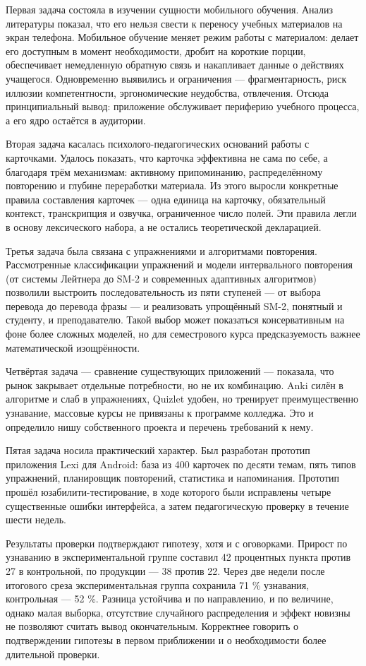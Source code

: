 \documentclass[11pt,a4paper,openany]{report}
\begin{document}
Первая задача состояла в изучении сущности мобильного обучения. Анализ литературы показал, что его нельзя свести к переносу учебных материалов на экран телефона. Мобильное обучение меняет режим работы с материалом: делает его доступным в момент необходимости, дробит на короткие порции, обеспечивает немедленную обратную связь и накапливает данные о действиях учащегося. Одновременно выявились и ограничения — фрагментарность, риск иллюзии компетентности, эргономические неудобства, отвлечения. Отсюда принципиальный вывод: приложение обслуживает периферию учебного процесса, а его ядро остаётся в аудитории.

Вторая задача касалась психолого-педагогических оснований работы с карточками. Удалось показать, что карточка эффективна не сама по себе, а благодаря трём механизмам: активному припоминанию, распределённому повторению и глубине переработки материала. Из этого выросли конкретные правила составления карточек — одна единица на карточку, обязательный контекст, транскрипция и озвучка, ограниченное число полей. Эти правила легли в основу лексического набора, а не остались теоретической декларацией.

Третья задача была связана с упражнениями и алгоритмами повторения. Рассмотренные классификации упражнений и модели интервального повторения (от системы Лейтнера до SM-2 и современных адаптивных алгоритмов) позволили выстроить последовательность из пяти ступеней — от выбора перевода до перевода фразы — и реализовать упрощённый SM-2, понятный и студенту, и преподавателю. Такой выбор может показаться консервативным на фоне более сложных моделей, но для семестрового курса предсказуемость важнее математической изощрённости.

Четвёртая задача — сравнение существующих приложений — показала, что рынок закрывает отдельные потребности, но не их комбинацию. Anki силён в алгоритме и слаб в упражнениях, Quizlet удобен, но тренирует преимущественно узнавание, массовые курсы не привязаны к программе колледжа. Это и определило нишу собственного проекта и перечень требований к нему.

Пятая задача носила практический характер. Был разработан прототип приложения Lexi для Android: база из 400 карточек по десяти темам, пять типов упражнений, планировщик повторений, статистика и напоминания. Прототип прошёл юзабилити-тестирование, в ходе которого были исправлены четыре существенные ошибки интерфейса, а затем педагогическую проверку в течение шести недель.

Результаты проверки подтверждают гипотезу, хотя и с оговорками. Прирост по узнаванию в экспериментальной группе составил 42 процентных пункта против 27 в контрольной, по продукции — 38 против 22. Через две недели после итогового среза экспериментальная группа сохранила 71 \% узнавания, контрольная — 52 \%. Разница устойчива и по направлению, и по величине, однако малая выборка, отсутствие случайного распределения и эффект новизны не позволяют считать вывод окончательным. Корректнее говорить о подтверждении гипотезы в первом приближении и о необходимости более длительной проверки.
\end{document}
